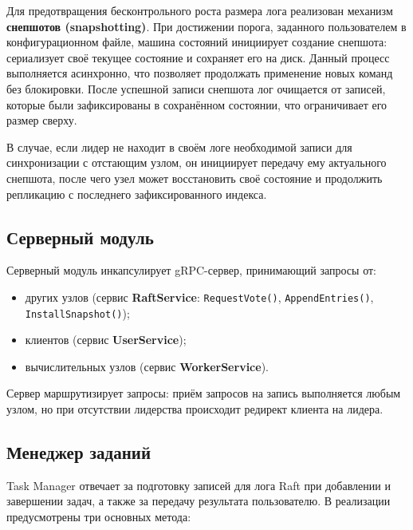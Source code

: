 Для предотвращения бесконтрольного роста размера лога реализован механизм
\textbf{снепшотов (snapshotting)}. При достижении порога, заданного
пользователем в конфигурационном файле, машина состояний инициирует создание
снепшота: сериализует своё текущее состояние и сохраняет его на диск. Данный
процесс выполняется асинхронно, что позволяет продолжать применение новых
команд без блокировки. После успешной записи снепшота лог очищается от записей,
которые были зафиксированы в сохранённом состоянии, что ограничивает его размер
сверху.

В случае, если лидер не находит в своём логе необходимой записи для
синхронизации с отстающим узлом, он инициирует передачу ему актуального
снепшота, после чего узел может восстановить своё состояние и продолжить
репликацию с последнего зафиксированного индекса.

\subsection{Серверный модуль}

Серверный модуль инкапсулирует gRPC-сервер, принимающий запросы от:
\begin{itemize}
    \item других узлов (сервис \textbf{RaftService}: \texttt{RequestVote()},
    \texttt{AppendEntries()}, \texttt{InstallSnapshot()});
    \item клиентов (сервис \textbf{UserService});
    \item вычислительных узлов (сервис \textbf{WorkerService}).
\end{itemize}

Сервер маршрутизирует запросы: приём запросов на запись выполняется любым
узлом, но при отсутствии лидерства происходит редирект клиента на лидера.

\subsection{Менеджер заданий}

Task Manager отвечает за подготовку записей для лога Raft при добавлении и
завершении задач, а также за передачу результата пользователю. В реализации
предусмотрены три основных метода:

